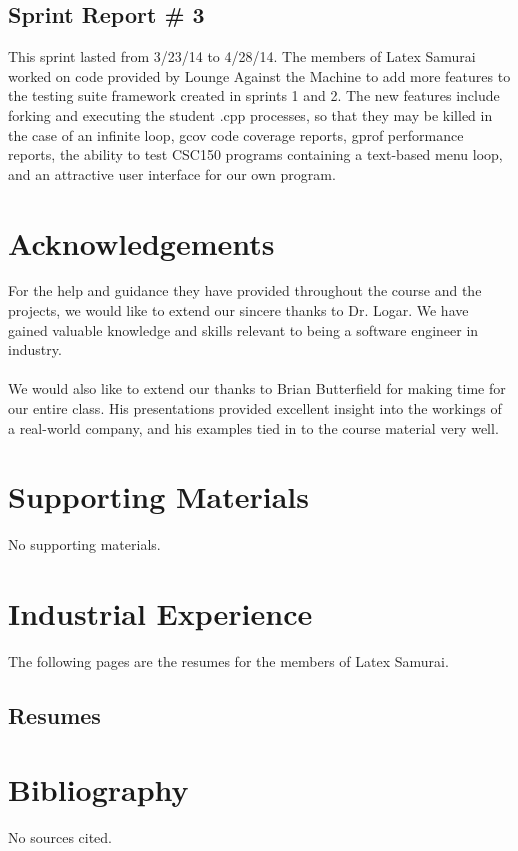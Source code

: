 \documentclass {article}
\begin{document}
		\subsection{\Large{\color{blue}Sprint Report \# 3}}
			This sprint lasted from 3/23/14 to 4/28/14. The members of Latex Samurai worked on code
			 provided by Lounge Against the Machine to add more features to the testing suite
			 framework created in sprints 1 and 2. The new features include forking and executing
			 the student .cpp processes, so that they may be killed in the case of an infinite
			 loop, gcov code coverage reports, gprof performance reports, the ability to test
			 CSC150 programs containing a text-based menu loop, and an attractive user interface
			 for our own program.	
		
		
	\newpage
	\section*{\LARGE{\color{blue}Acknowledgements}}
		For the help and guidance they have provided throughout the course and the projects, we
		 would like to extend our sincere thanks to Dr. Logar. We have gained valuable knowledge
		 and skills relevant to being a software engineer in industry.\\ \ \\ 
		 We would also like to extend
		 our thanks to Brian Butterfield for making time for our entire class. His presentations
		 provided excellent insight into the workings of a real-world company, and his examples
		 tied in to the course material very well.	
		 
		 
	\newpage
	\section*{\LARGE{\color{blue}Supporting Materials}}
		No supporting materials.
		
		
	\newpage
	\section*{\LARGE{\color{blue}Industrial Experience}}
		The following pages are the resumes for the members of Latex Samurai.
			\subsection{\Large{\color{blue}Resumes}}	 
		 		
		 		
		 		
		 		
		 		
	\newpage
	\section*{\LARGE{\color{blue}Bibliography}}	
		No sources cited.	
		 			 
\end{document}
